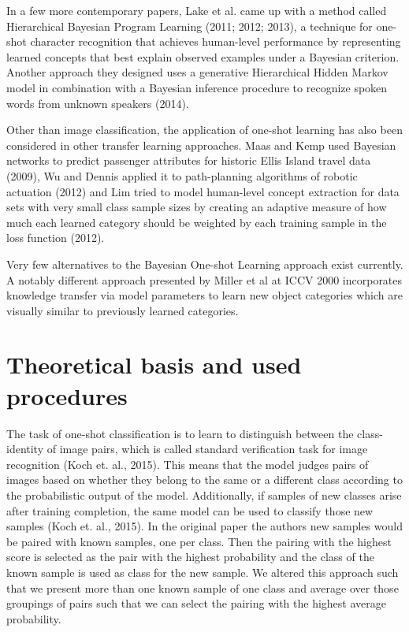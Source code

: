 ﻿\documentclass[a4paper,pt12]{article}
\begin{document}
In a few more contemporary papers, Lake et al. came up with a method called Hierarchical Bayesian Program Learning (2011; 2012; 2013), a technique for one-shot character recognition that achieves human-level performance by representing learned concepts that best explain observed examples under a Bayesian criterion. Another approach they designed uses a generative Hierarchical Hidden Markov model in combination with a Bayesian inference procedure to recognize spoken words from unknown speakers (2014).

Other than image classification, the application of one-shot learning has also been considered in other transfer learning approaches. Maas and Kemp used Bayesian networks to predict passenger attributes for historic Ellis Island travel data (2009), Wu and Dennis applied it to path-planning algorithms of robotic actuation (2012) and Lim tried to model human-level concept extraction for data sets with very small class sample sizes by creating an adaptive measure of how much each learned category should be weighted by each training sample in the loss function (2012).

Very few alternatives to the Bayesian One-shot Learning approach exist currently. A notably different approach presented by Miller et al at ICCV 2000 incorporates knowledge transfer via model parameters to learn new object categories which are visually similar to previously learned categories.

\section{Theoretical basis and used procedures}
The task of one-shot classification is to learn to distinguish between the class-identity of image pairs, which is called standard verification task for image recognition (Koch et. al., 2015). This means that the model judges pairs of images based on whether they belong to the same or a different class according to the probabilistic output of the model. Additionally, if samples of new classes arise after training completion, the same model can be used to classify those new samples (Koch et. al., 2015). In the original paper the authors new samples would be paired with known samples, one per class. Then the pairing with the highest score is selected as the pair with the highest probability and the class of the known sample is used as class for the new sample. We altered this approach such that we present more than one known sample of one class and average over those groupings of pairs such that we can select the pairing with the highest average probability.
\end{document}
